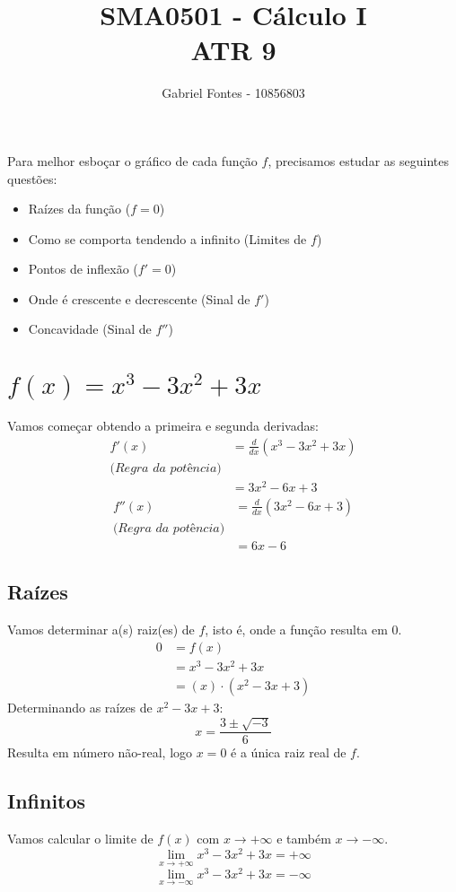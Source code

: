 \documentclass[12pt]{article}
\title{SMA0501 - Cálculo I \\ ATR 9}%
\author{Gabriel Fontes - 10856803}%
\theoremstyle{definition}
\begin{document}
\maketitle
Para melhor esboçar o gráfico de cada função \(f\), precisamos estudar as seguintes questões:
\begin{itemize}
    \item Raízes da função (\(f=0\))
    \item Como se comporta tendendo a infinito (Limites de \(f\))
    \item Pontos de inflexão (\(f'=0\))
    \item Onde é crescente e decrescente (Sinal de \(f'\))
    \item Concavidade (Sinal de \(f''\))
\end{itemize}

\section{\(f(x)=x^3-3x^2+3x\)}
Vamos começar obtendo a primeira e segunda derivadas:
\begin{align*}
    f'(x)
    &= \frac{d}{dx} (x^3-3x^2+3x) \\
    \textit{(Regra da potência)} \\
    &= 3x^2 - 6x + 3
\end{align*}
\begin{align*}
    f''(x)
    &= \frac{d}{dx} (3x^2-6x+3) \\
    \textit{(Regra da potência)} \\
    &= 6x - 6
\end{align*}
\subsection{Raízes}
Vamos determinar a(s) raiz(es) de \(f\), isto é, onde a função resulta em 0.%
\begin{align*}
    0 &= f(x) \\
      &= x^3-3x^2+3x\\
      &= (x)\cdot(x^2-3x+3)
\end{align*}
Determinando as raízes de \(x^2-3x+3\):
\[
    x = \frac{3\pm\sqrt{-3}}{6}
\]
Resulta em número não-real, logo \(x=0\) é a única raiz real de \(f\).
\subsection{Infinitos}
Vamos calcular o limite de \(f(x)\) com \(x\rightarrow +\infty\) e também \(x\rightarrow -\infty\).
\[
    \lim_{x\rightarrow +\infty}{x^3-3x^2+3x} = +\infty
\]
\[
    \lim_{x\rightarrow -\infty}{x^3-3x^2+3x} = -\infty
\]
\end{document}
